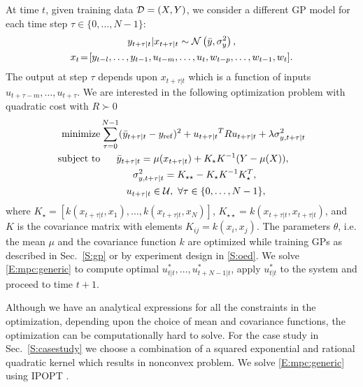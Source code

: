 At time \(t\), given training data \(\mathcal{D} = (X,Y) \), we consider a different GP model for each time step \(\tau \in \{0,\dots,N-1\}\):
\begin{gather}
y_{t+\tau|t} | x_{t+\tau|t} \sim \operatorname*{\mathcal{N}}\left(\bar{y}, \sigma^2_y\right), \\
x_{t}\!=\![y_{t-l}, \dots, y_{t-1}, u_{t-m}, \dots, u_t, w_{t-p}, \dots, w_{t-1}, w_t]. \nonumber
\end{gather}
The output at step \(\tau\) depends upon \(x_{t+\tau|t}\)  which is a function of inputs \(u_{t+\tau-m}, \dots, u_{t+\tau}\).
We are interested in the following optimization problem with quadratic cost with \(R \succ 0\)
\begin{align}
\label{E:mpc:generic}
\minimize & \sum_{\tau=0}^{N-1} (\bar{y}_{t+\tau|t}-y_{\mathrm{ref}})^2 + {u_{t+\tau|t}}^T R {u_{t+\tau|t}}+ \lambda \sigma^2_{y,t+\tau|t} \nonumber \\
\st & \ \ \ \ \ \bar{y}_{t+\tau|t} = \mu(x_{t+\tau|t}) + K_\star K^{-1} (Y - \mu(X)), \nonumber\\
& \ \ \ \ \ \ \ \ \ \ \sigma^2_{y,t+\tau|t} = K_{\star \star} - K_\star K^{-1} K_\star^T, \\
& \ \ \ \ \ \ \ \  u_{t+\tau|t} \in \mathcal{U}, \  \forall \tau \in \{0,\dots,N-1\}, \nonumber
\end{align}
where \(K_\star = [k(x_{t+\tau|t}, x_1), \dots, k(x_{t+\tau|t}, x_N)]\), \(K_{\star \star} = k(x_{t+\tau|t}, x_{t+\tau|t})\), and $K$ is the covariance matrix with elements \(K_{ij} = k(x_i, x_j)\). The parameters \(\theta\), i.e. the mean \(\mu\) and the covariance function \(k\) are optimized while training GPs as described in Sec.~\ref{S:gp} or by experiment design in \ref{S:oed}. We solve \eqref{E:mpc:generic} to compute optimal \(u_{t|t}^*, \dots, u_{t+N-1|t}^*\), apply \(u_{t|t}^*\) to the system and proceed to time \(t+1\).

Although we have an analytical expressions for all the constraints in the optimization, depending upon the choice of mean and covariance functions, the optimization can be computationally hard to solve. For the case study in Sec.~\ref{S:casestudy} we choose a combination of a squared exponential and rational quadratic kernel which results in nonconvex problem. We solve \eqref{E:mpc:generic} using IPOPT \cite{Waechter2009b}.



